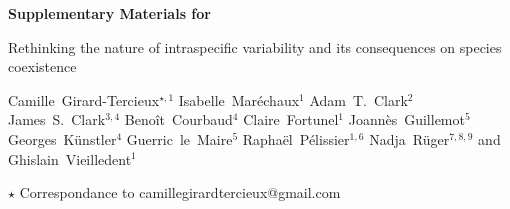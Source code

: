 
\begin{center}
  \Large{\textbf{Supplementary Materials for}}
\end{center}

\vspace{1cm}

\begin{center}
  \LARGE{Rethinking the nature of intraspecific variability and its consequences on species coexistence}
\end{center}

\vspace{1cm}

\begin{center}
  \large{
  Camille~Girard-Tercieux$^{\star, 1}$ \hspace{0.5cm} Isabelle~Maréchaux$^{1}$ \hspace{0.5cm} Adam~T.~Clark$^2$ \hspace{0.5cm} James~S.~Clark$^{3,4}$ \hspace{0.5cm} Benoît~Courbaud$^{4}$ \hspace{0.5cm} Claire~Fortunel$^{1}$ \hspace{0.5cm} Joannès~Guillemot$^{5}$ \hspace{0.5cm} Georges~Künstler$^{4}$ \hspace{0.5cm} Guerric~le~Maire$^{5}$ \hspace{0.5cm} Raphaël~Pélissier$^{1, 6}$ \hspace{0.5cm} Nadja~Rüger$^{7, 8, 9}$ \hspace{0.5cm} and Ghislain~Vieilledent$^{1}$
  }
\end{center}

\vspace{0.5cm}

\begin{center}
  $\star$ Correspondance to camillegirardtercieux@gmail.com\\
\end{center}

\vspace{0.5cm}

